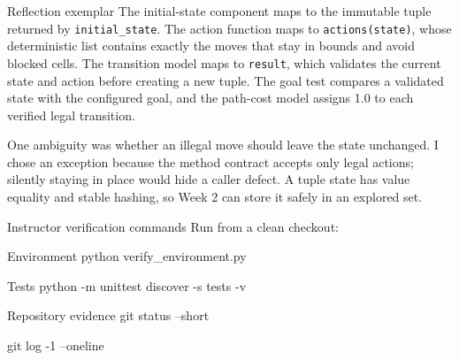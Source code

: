 \documentclass[aspectratio=169,11pt]{beamer}
\begin{document}
\begin{frame}{Reflection exemplar}
  \small
  \answerlabel The initial-state component maps to the immutable tuple returned
  by \texttt{initial\_state}. The action function maps to
  \texttt{actions(state)}, whose deterministic list contains exactly the moves
  that stay in bounds and avoid blocked cells. The transition model maps to
  \texttt{result}, which validates the current state and action before creating
  a new tuple. The goal test compares a validated state with the configured
  goal, and the path-cost model assigns 1.0 to each verified legal transition.

  \vspace{0.3cm}
  One ambiguity was whether an illegal move should leave the state unchanged.
  I chose an exception because the method contract accepts only legal actions;
  silently staying in place would hide a caller defect. A tuple state has value
  equality and stable hashing, so Week 2 can store it safely in an explored set.
\end{frame}

\begin{frame}{Instructor verification commands}
  Run from a clean checkout:

  \vspace{0.35cm}
  \begin{block}{Environment}
    \ttfamily python verify\_environment.py
  \end{block}
  \begin{block}{Tests}
    \ttfamily python -m unittest discover -s tests -v
  \end{block}
  \begin{block}{Repository evidence}
    \ttfamily git status --short\par
    git log -1 --oneline
  \end{block}

\end{frame}
\end{document}
